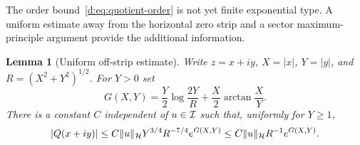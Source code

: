 \documentclass[11pt,a4paper]{article}
\numberwithin{equation}{section}
\newtheorem{lemma}[theorem]{Lemma}
\theoremstyle{definition}\newtheorem{definition}[theorem]{Definition}
\theoremstyle{remark}\newtheorem{remark}[theorem]{Remark}
\newcommand{\Hh}{\mathcal H}\newcommand{\Hw}{\mathcal H}
\begin{document}
The order bound~\eqref{d:eq:quotient-order} is not yet finite exponential type. A uniform estimate away from the horizontal zero strip and a sector maximum-principle argument provide the additional information.

\begin{lemma}[Uniform off-strip estimate]\label{d:lem:offstrip}
Write $z=x+iy$, $X=|x|$, $Y=|y|$, and $R=(X^2+Y^2)^{1/2}$. For $Y>0$ set
\begin{equation}\label{d:eq:G-function}
 G(X,Y)=\frac Y2\log\frac{2Y}{R}+\frac X2\arctan\frac XY.
\end{equation}
There is a constant $C$ independent of $u\in\mathcal I$ such that, uniformly for $Y\ge1$,
\begin{equation}\label{d:eq:offstrip}
 |Q(x+iy)|\le C\norm{u}_{\Hh}Y^{3/4}R^{-7/4}e^{G(X,Y)}
 \le C\norm{u}_{\Hh}R^{-1}e^{G(X,Y)}.
\end{equation}
\end{lemma}
\end{document}
